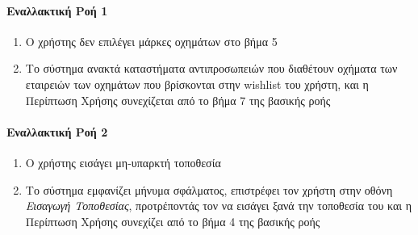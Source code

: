 \documentclass{../ol-softwaremanual}
\begin{document}
	\paragraph{Εναλλακτική Ροή 1}
	\begin{enumerate}
		\item Ο χρήστης δεν επιλέγει μάρκες οχημάτων στο βήμα 5
		\item Το σύστημα ανακτά καταστήματα αντιπροσωπειών που διαθέτουν οχήματα των εταιρειών των οχημάτων που βρίσκονται στην \en wishlist \gr του χρήστη, και η Περίπτωση Χρήσης συνεχίζεται από το βήμα 7 της βασικής ροής
	\end{enumerate}
	
	\paragraph{Εναλλακτική Ροή 2}
	\begin{enumerate}
			\item Ο χρήστης εισάγει μη-υπαρκτή τοποθεσία
			\item Το σύστημα εμφανίζει μήνυμα σφάλματος, επιστρέφει τον χρήστη στην οθόνη \textit{Εισαγωγή Τοποθεσίας}, προτρέποντάς τον να εισάγει ξανά την τοποθεσία του και η Περίπτωση Χρήσης συνεχίζει από το βήμα 4 της βασικής ροής		
	\end{enumerate}
	
	
	
\end{document}
